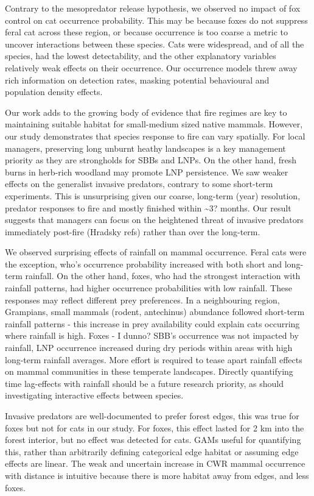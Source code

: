 \documentclass[11pt,a4paper,titlepage,twoside,openright]{style/unimelbthesis}
\begin{document}
\begin{mainmatter}
Contrary to the mesopredator release hypothesis, we observed no impact of fox control on cat occurrence probability. This may be because foxes do not suppress feral cat across these region, or because occurrence is too coarse a metric to uncover interactions between these species. Cats were widespread, and of all the species, had the lowest detectability, and the other explanatory variables relatively weak effects on their occurrence. Our occurrence models threw away rich information on detection rates, masking potential behavioural and population density effects.

Our work adds to the growing body of evidence that fire regimes are key to maintaining suitable habitat for small-medium sized native mammals. However, our study demonstrates that species response to fire can vary spatially. For local managers, preserving long unburnt heathy landscapes is a key management priority as they are strongholds for SBBs and LNPs. On the other hand, fresh burns in herb-rich woodland may promote LNP persistence. We saw weaker effects on the generalist invasive predators, contrary to some short-term experiments. This is unsurprising given our coarse, long-term (year) resolution, predator responses to fire and mostly finished within \textasciitilde3? months. Our result suggests that managers can focus on the heightened threat of invasive predators immediately post-fire (Hradsky refs) rather than over the long-term.

We observed surprising effects of rainfall on mammal occurrence. Feral cats were the exception, who's occurrence probability increased with both short and long-term rainfall. On the other hand, foxes, who had the strongest interaction with rainfall patterns, had higher occurrence probabilities with low rainfall. These responses may reflect different prey preferences. In a neighbouring region, Grampians, small mammals (rodent, antechinus) abundance followed short-term rainfall patterns - this increase in prey availability could explain cats occurring where rainfall is high. Foxes - I dunno? SBB's occurrence was not impacted by rainfall, LNP occurrence increased during dry periods within areas with high long-term rainfall averages. More effort is required to tease apart rainfall effects on mammal communities in these temperate landscapes. Directly quantifying time lag-effects with rainfall should be a future research priority, as should investigating interactive effects between species.

Invasive predators are well-documented to prefer forest edges, this was true for foxes but not for cats in our study. For foxes, this effect lasted for 2 km into the forest interior, but no effect was detected for cats. GAMs useful for quantifying this, rather than arbitrarily defining categorical edge habitat or assuming edge effects are linear. The weak and uncertain increase in CWR mammal occurrence with distance is intuitive because there is more habitat away from edges, and less foxes.


\end{mainmatter}
\end{document}
